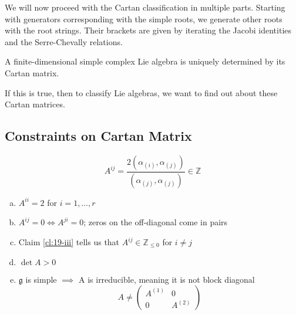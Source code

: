 We will now proceed with the Cartan classification in multiple parts.
Starting with generators corresponding with the simple roots, we generate other roots with the root strings. Their brackets are given by iterating the Jacobi identities and the Serre-Chevally relations.

\begin{claim}
  A finite-dimensional simple complex Lie algebra is uniquely determined by its Cartan matrix.
\end{claim}
If this is true, then to classify Lie algebras, we want to find out about these Cartan matrices.

\subsection{Constraints on Cartan Matrix}%
\label{sub:constraints_on_cartan_matrix}

\begin{equation}
  A^{ij} = \frac{2(\alpha_{(i)}, \alpha_{(j)})}{(\alpha_{(j)}, \alpha_{(j)})} \in \mathbb{Z}
\end{equation}

\begin{enumerate}[a)]
  \item $A^{ii} = 2$ for $i = 1, \dots, r$
  \item $A^{ij} = 0 \iff A^{ji} = 0$; zeros on the off-diagonal come in pairs
  \item Claim \ref{cl:19-iii} tells us that $A^{ij} \in \mathbb{Z}_{\leq 0}$ for $i \neq j$
  \item $\det A > 0$
  \item $\mathfrak{g}$ is simple $\implies$ A is irreducible, meaning it is not block diagonal
    \begin{equation}
      A \neq 
      \begin{pmatrix}
      A^{(1)} & 0 \\
      0 & A^{(2)}
      \end{pmatrix}
    \end{equation}
\end{enumerate}


